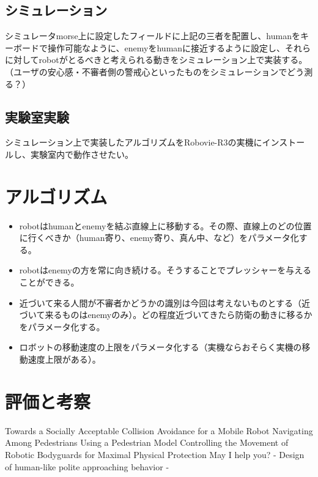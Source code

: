 \documentclass[twocolumn,12pt]{jsarticle}
\begin{document}
\subsection{シミュレーション}
シミュレータmorse上に設定したフィールドに上記の三者を配置し、humanをキーボードで操作可能なように、enemyをhumanに接近するように設定し、それらに対してrobotがとるべきと考えられる動きをシミュレーション上で実装する。
（ユーザの安心感・不審者側の警戒心といったものをシミュレーションでどう測る？）

\subsection{実験室実験}
シミュレーション上で実装したアルゴリズムをRobovie-R3の実機にインストールし、実験室内で動作させたい。

\section{アルゴリズム}
\begin{itemize}
	\item robotはhumanとenemyを結ぶ直線上に移動する。その際、直線上のどの位置に行くべきか（human寄り、enemy寄り、真ん中、など）をパラメータ化する。
	\item robotはenemyの方を常に向き続ける。そうすることでプレッシャーを与えることができる。
	\item 近づいて来る人間が不審者かどうかの識別は今回は考えないものとする（近づいて来るものはenemyのみ）。どの程度近づいてきたら防衛の動きに移るかをパラメータ化する。
	\item ロボットの移動速度の上限をパラメータ化する（実機ならおそらく実機の移動速度上限がある）。
\end{itemize}



\section{評価と考察}

\begin{thebibliography}{3}
 Towards a Socially Acceptable Collision Avoidance for a Mobile Robot Navigating Among Pedestrians Using a Pedestrian Model
 Controlling the Movement of Robotic Bodyguards for Maximal Physical Protection
 May I help you? - Design of human-like polite approaching behavior -
\end{thebibliography}
\end{document}
